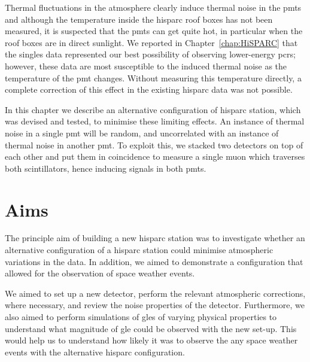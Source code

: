Thermal fluctuations in the atmosphere clearly induce thermal noise in the \glspl{pmt} and although the temperature inside the \gls{hisparc} roof boxes has not been measured, it is suspected that the \glspl{pmt} can get quite hot, in particular when the roof boxes are in direct sunlight. We reported in Chapter~\ref{chap:HiSPARC} that the singles data represented our best possibility of observing lower-energy \glspl{pcr}; however, these data are most susceptible to the induced thermal noise as the temperature of the \gls{pmt} changes. Without measuring this temperature directly, a complete correction of this effect in the existing \gls{hisparc} data was not possible.

In this chapter we describe an alternative configuration of \gls{hisparc} station, which was devised and tested, to minimise these limiting effects. An instance of thermal noise in a single \gls{pmt} will be random, and uncorrelated with an instance of thermal noise in another \gls{pmt}. To exploit this, we stacked two detectors on top of each other and put them in coincidence to measure a single muon which traverses both scintillators, hence inducing signals in both \glspl{pmt}.




\section{Aims}\label{sec:HS_14008_aims}

The principle aim of building a new \gls{hisparc} station was to investigate whether an alternative configuration of a \gls{hisparc} station could minimise atmospheric variations in the data. In addition, we aimed to demonstrate a configuration that allowed for the observation of space weather events.

We aimed to set up a new detector, perform the relevant atmospheric corrections, where necessary, and review the noise properties of the detector. Furthermore, we also aimed to perform simulations of \glspl{gle} of varying physical properties to understand what magnitude of \gls{gle} could be observed with the new set-up. This would help us to understand how likely it was to observe the any space weather events with the alternative \gls{hisparc} configuration.



